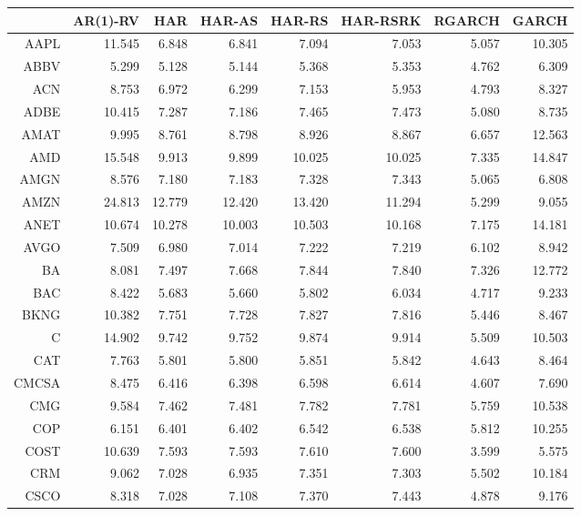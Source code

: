 \begin{table}[ht]
\centering
\begin{tabular}{rrrrrrrr}
  \hline
 & AR(1)-RV & HAR & HAR-AS & HAR-RS & HAR-RSRK & RGARCH & GARCH \\ 
  \hline
AAPL & 11.545 & 6.848 & 6.841 & 7.094 & 7.053 & 5.057 & 10.305 \\ 
  ABBV & 5.299 & 5.128 & 5.144 & 5.368 & 5.353 & 4.762 & 6.309 \\ 
  ACN & 8.753 & 6.972 & 6.299 & 7.153 & 5.953 & 4.793 & 8.327 \\ 
  ADBE & 10.415 & 7.287 & 7.186 & 7.465 & 7.473 & 5.080 & 8.735 \\ 
  AMAT & 9.995 & 8.761 & 8.798 & 8.926 & 8.867 & 6.657 & 12.563 \\ 
  AMD & 15.548 & 9.913 & 9.899 & 10.025 & 10.025 & 7.335 & 14.847 \\ 
  AMGN & 8.576 & 7.180 & 7.183 & 7.328 & 7.343 & 5.065 & 6.808 \\ 
  AMZN & 24.813 & 12.779 & 12.420 & 13.420 & 11.294 & 5.299 & 9.055 \\ 
  ANET & 10.674 & 10.278 & 10.003 & 10.503 & 10.168 & 7.175 & 14.181 \\ 
  AVGO & 7.509 & 6.980 & 7.014 & 7.222 & 7.219 & 6.102 & 8.942 \\ 
  BA & 8.081 & 7.497 & 7.668 & 7.844 & 7.840 & 7.326 & 12.772 \\ 
  BAC & 8.422 & 5.683 & 5.660 & 5.802 & 6.034 & 4.717 & 9.233 \\ 
  BKNG & 10.382 & 7.751 & 7.728 & 7.827 & 7.816 & 5.446 & 8.467 \\ 
  C & 14.902 & 9.742 & 9.752 & 9.874 & 9.914 & 5.509 & 10.503 \\ 
  CAT & 7.763 & 5.801 & 5.800 & 5.851 & 5.842 & 4.643 & 8.464 \\ 
  CMCSA & 8.475 & 6.416 & 6.398 & 6.598 & 6.614 & 4.607 & 7.690 \\ 
  CMG & 9.584 & 7.462 & 7.481 & 7.782 & 7.781 & 5.759 & 10.538 \\ 
  COP & 6.151 & 6.401 & 6.402 & 6.542 & 6.538 & 5.812 & 10.255 \\ 
  COST & 10.639 & 7.593 & 7.593 & 7.610 & 7.600 & 3.599 & 5.575 \\ 
  CRM & 9.062 & 7.028 & 6.935 & 7.351 & 7.303 & 5.502 & 10.184 \\ 
  CSCO & 8.318 & 7.028 & 7.108 & 7.370 & 7.443 & 4.878 & 9.176 \\ 

\end{tabular}
\end{table}
